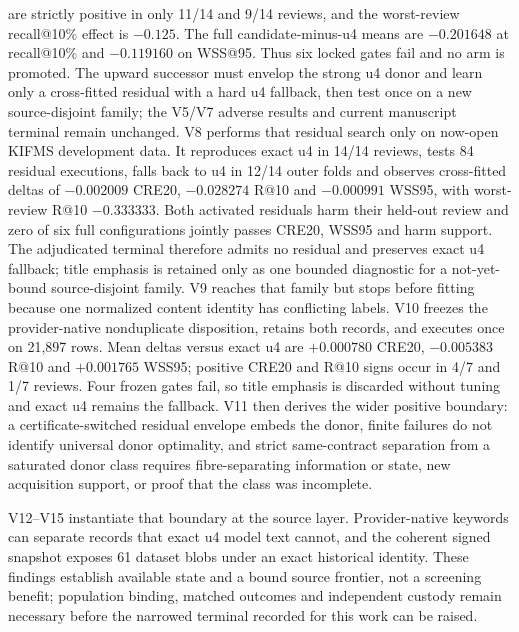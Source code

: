 \documentclass[11pt]{article}
\theoremstyle{definition}
\begin{document}
are strictly positive in only 11/14 and 9/14 reviews, and the worst-review
recall@10\% effect is $-0.125$. The full candidate-minus-u4 means are
$-0.201648$ at recall@10\% and $-0.119160$ on WSS@95. Thus six locked gates
fail and no arm is promoted. The upward successor must envelop the strong u4
donor and learn only a cross-fitted residual with a hard u4 fallback, then test
once on a new source-disjoint family; the V5/V7 adverse results and current
manuscript terminal remain unchanged. V8 performs that residual search only on
now-open KIFMS development data. It reproduces exact u4 in 14/14 reviews, tests
84 residual executions, falls back to u4 in 12/14 outer folds and observes
cross-fitted deltas of $-0.002009$ CRE20, $-0.028274$ R@10 and $-0.000991$
WSS95, with worst-review R@10 $-0.333333$. Both activated residuals harm their
held-out review and zero of six full configurations jointly passes CRE20,
WSS95 and harm support. The adjudicated terminal therefore admits no residual
and preserves exact u4 fallback; title emphasis is retained only as one bounded
diagnostic for a not-yet-bound source-disjoint family. V9 reaches that family
but stops before fitting because one normalized content identity has conflicting
labels. V10 freezes the provider-native nonduplicate disposition, retains both
records, and executes once on 21,897 rows. Mean deltas versus exact u4 are
$+0.000780$ CRE20, $-0.005383$ R@10 and $+0.001765$ WSS95; positive CRE20 and
R@10 signs occur in 4/7 and 1/7 reviews. Four frozen gates fail, so title
emphasis is discarded without tuning and exact u4 remains the fallback. V11
then derives the wider positive boundary: a certificate-switched residual
envelope embeds the donor, finite failures do not identify universal donor
optimality, and strict same-contract separation from a saturated donor class
requires fibre-separating information or state, new acquisition support, or
proof that the class was incomplete.

V12--V15 instantiate that boundary at the source layer.  Provider-native
keywords can separate records that exact u4 model text cannot, and the coherent
signed snapshot exposes 61 dataset blobs under an exact historical identity.
These findings establish available state and a bound source frontier, not a
screening benefit; population binding, matched outcomes and independent custody
remain necessary before the narrowed terminal recorded for this work can be
raised.



\end{document}
